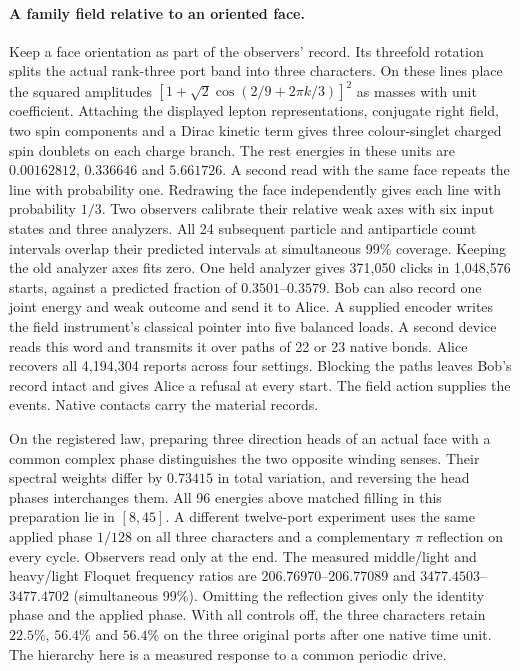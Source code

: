 \paragraph{A family field relative to an oriented face.}
Keep a face orientation as part of the observers' record. Its threefold
rotation splits the actual rank-three port band into three characters.
On these lines place the squared amplitudes
$[1+\sqrt2\cos(2/9+2\pi k/3)]^2$ as masses with unit coefficient.
Attaching the displayed lepton representations, conjugate right field,
two spin components and a Dirac kinetic term gives three colour-singlet
charged spin doublets on each charge branch. The rest energies in these
units are $0.00162812$, $0.336646$ and $5.661726$.
A second read with the same face repeats the line with probability one.
Redrawing the face independently gives each line with probability $1/3$.
Two observers calibrate their relative weak axes with six input states and
three analyzers. All 24 subsequent particle and antiparticle count intervals
overlap their predicted intervals at simultaneous 99\% coverage. Keeping the
old analyzer axes fits zero. One held analyzer gives 371,050 clicks in
1,048,576 starts, against a predicted fraction of $0.3501$--$0.3579$.
Bob can also record one joint energy and weak outcome and send it to Alice.
A supplied encoder writes the field instrument's classical pointer into
five balanced loads. A second device reads this word and transmits it over
paths of 22 or 23 native bonds. Alice recovers all 4,194,304 reports across
four settings. Blocking the paths leaves Bob's record intact and gives
Alice a refusal at every start. The field action supplies the events.
Native contacts carry the material records.

On the registered law, preparing three direction heads of an actual face
with a common complex phase distinguishes the two opposite winding senses.
Their spectral weights differ by $0.73415$ in total variation, and reversing
the head phases interchanges them. All 96 energies above matched filling in
this preparation lie in $[8,45]$. A different twelve-port experiment uses
the same applied phase $1/128$ on all three characters and a complementary
$\pi$ reflection on every cycle. Observers read only at the end. The
measured middle/light and heavy/light Floquet frequency ratios are
$206.76970$--$206.77089$ and $3477.4503$--$3477.4702$ (simultaneous 99\%).
Omitting the reflection gives only the identity phase and the applied phase.
With all controls off, the three characters retain $22.5\%$, $56.4\%$ and
$56.4\%$ on the three original ports after one native time unit. The
hierarchy here is a measured response to a common periodic drive.


